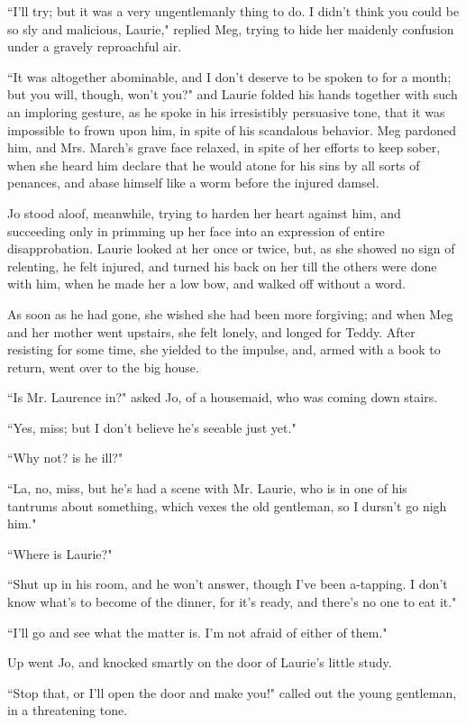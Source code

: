 ``I'll try; but it was a very ungentlemanly thing to do.
I didn't think you could be so sly and malicious,
Laurie," replied Meg, trying to hide her maidenly confusion under a
gravely reproachful air.

``It was altogether abominable, and I don't deserve to be
spoken to for a month; but you will, though, won't you?"
and Laurie folded his hands together with such an imploring gesture, as
he spoke in his irresistibly persuasive tone, that it was impossible to
frown upon him, in spite of his scandalous behavior. Meg pardoned him,
and Mrs. March's grave face relaxed, in spite of her
efforts to keep sober, when she heard him declare that he would atone
for his sins by all sorts of penances, and abase himself like a worm
before the injured damsel.

Jo stood aloof, meanwhile, trying to harden her heart against him, and
succeeding only in primming up her face into an expression of entire
disapprobation. Laurie looked at her once or twice, but, as she showed
no sign of relenting, he felt injured, and turned his back on her till
the others were done with him, when he made her a low bow, and walked
off without a word.

As soon as he had gone, she wished she had been more forgiving; and when
Meg and her mother went upstairs, she felt lonely, and longed for Teddy.
After resisting for some time, she yielded to the impulse, and, armed
with a book to return, went over to the big house.

``Is Mr. Laurence in?" asked Jo, of a housemaid, who was coming down
stairs.

``Yes, miss; but I don't believe he's
seeable just yet."

``Why not? is he ill?"

``La, no, miss, but he's had a scene with Mr. Laurie, who
is in one of his tantrums about something, which vexes the old
gentleman, so I dursn't go nigh him."

``Where is Laurie?"

``Shut up in his room, and he won't answer, though
I've been a-tapping. I don't know
what's to become of the dinner, for it's
ready, and there's no one to eat it."

``I'll go and see what the matter is. I'm
not afraid of either of them."

Up went Jo, and knocked smartly on the door of Laurie's
little study.

``Stop that, or I'll open the door and make you!" called
out the young gentleman, in a threatening tone.

